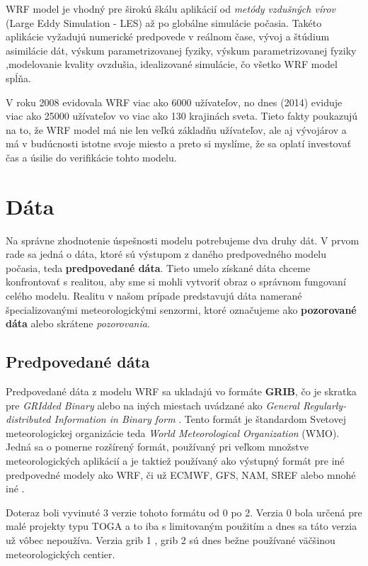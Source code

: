WRF model je vhodný pre širokú škálu aplikácií od \textit{metódy vzdušných vírov} (Large Eddy Simulation - LES) až po globálne simulácie počasia. Takéto aplikácie vyžadujú numerické predpovede v reálnom čase, vývoj a štúdium asimilácie dát, výskum parametrizovanej fyziky, výskum parametrizovanej fyziky ,modelovanie kvality ovzdušia, idealizované simulácie, čo všetko WRF model spĺňa.

V roku 2008 evidovala WRF viac ako 6000 užívateľov, no dnes (2014) eviduje viac ako 25000 užívateľov vo viac ako 130 krajinách sveta. Tieto fakty poukazujú na to, že WRF model má nie len veľkú základňu užívateľov, ale aj vývojárov a má v budúcnosti istotne svoje miesto a preto si myslíme, že sa oplatí investovať čas a úsilie do verifikácie tohto modelu.

\section{Dáta}
\label{sec:data}
Na správne zhodnotenie úspešnosti modelu potrebujeme dva druhy dát. V prvom rade sa jedná o dáta, ktoré sú výstupom z daného predpovedného modelu počasia, teda \textbf{predpovedané dáta}. Tieto umelo získané dáta chceme konfrontovať s realitou, aby sme si mohli vytvoriť obraz o správnom fungovaní celého modelu. Realitu v našom prípade predstavujú dáta namerané špecializovanými meteorologickými senzormi, ktoré označujeme ako \textbf{pozorované dáta} alebo skrátene \textit{pozorovania}.  

\subsection{Predpovedané dáta}
Predpovedané dáta z modelu WRF sa ukladajú vo formáte \textbf{GRIB}, čo je skratka pre \textit{GRIdded Binary} \cite{GRIB} alebo na iných miestach uvádzané ako \textit{General Regularly-distributed Information in Binary form} \cite{GRIB12}. Tento formát je štandardom Svetovej meteorologickej organizácie teda \textit{World Meteorological Organization} (WMO). Jedná sa o pomerne rozšírený formát, používaný pri veľkom množstve meteorologických aplikácií a je taktiež používaný ako výstupný formát pre iné predpovedné modely ako WRF, či už ECMWF, GFS, NAM, SREF alebo mnohé iné \cite{Products}.

Doteraz boli vyvinuté 3 verzie tohoto formátu od 0 po 2. Verzia 0 bola určená pre malé projekty typu TOGA a to iba s limitovaným použitím a dnes sa táto verzia už vôbec nepoužíva. Verzia grib 1 \cite{GRIB}, grib 2 \cite{GRIB12} sú dnes bežne používané väčšinou meteorologických centier.

